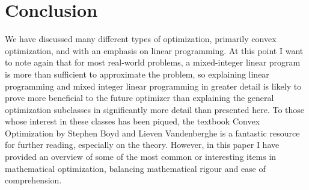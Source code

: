 \documentclass[10pt]{article}
\begin{document}
\section{Conclusion}
	We have discussed many different types of optimization, primarily convex optimization, and with an emphasis on linear programming. At this point I want to note again that for most real-world problems, a mixed-integer linear program is more than sufficient to approximate the problem, so explaining linear programming and mixed integer linear programming in greater detail is likely to prove more beneficial to the future optimizer than explaining the general optimization subclasses in significantly more detail than presented here. To those whose interest in these classes has been piqued, the textbook Convex Optimization by Stephen Boyd and Lieven Vandenberghe is a fantastic resource for further reading, especially on the theory. However, in this paper I have provided an overview of some of the most common or interesting items in mathematical optimization, balancing mathematical rigour and ease of comprehension.
\printbibliography
\end{document}
